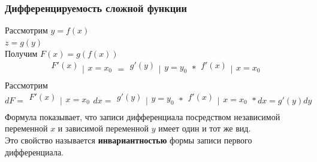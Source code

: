 \documentclass[12pt]{article}
\begin{document}
    \subsubsection*{Дифференцируемость сложной функции}
    \noindent Рассмотрим $y = f(x)$\\
    $z = g(y)$\\
    Получим $F(x) = g(f(x))$
    \[ \begin{matrix}F'(x)\\\\\end{matrix}\Big|\begin{matrix}\\x=x_0\\\end{matrix} = \begin{matrix}g'(y)\\\\\end{matrix}\Big|\begin{matrix}\\y=y_0\\\end{matrix} * \begin{matrix}f'(x)\\\\\end{matrix}\Big|\begin{matrix}\\x=x_0\\\end{matrix} \]
    Рассмотрим
    \[ dF = \begin{matrix}F'(x)\\\\\end{matrix}\Big|\begin{matrix}\\x=x_0\\\end{matrix}dx = \begin{matrix}g'(y)\\\\\end{matrix}\Big|\begin{matrix}\\y=y_0\\\end{matrix} * \begin{matrix}f'(x)\\\\\end{matrix}\Big|\begin{matrix}\\x=x_0\\\end{matrix}*dx = g'(y)dy \]
    Формула показывает, что записи дифференциала посредством независимой переменной $x$ и зависимой переменной $y$ имеет один и тот же вид.\\
    Это свойство называется \textbf{инвариантностью} формы записи первого дифференциала.
\end{document}
